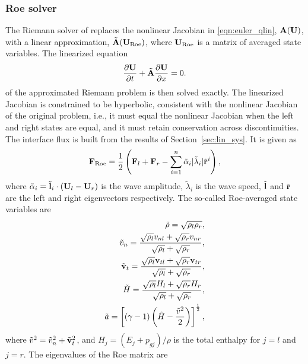 \subsubsection[Roe solver]{Roe solver}
\label{sec:roe_solver}

The Riemann solver of \citet{Roe:1981} replaces the nonlinear Jacobian in \eqref{eqn:euler_qlin}, $\mathbf{A} (\mathbf{U})$, with a linear approximation, $\tilde{\mathbf{A}} (\mathbf{U}_{\text{Roe}})$, where $\mathbf{U}_{\text{Roe}}$ is a matrix of averaged state variables.  The linearized equation
\begin{gather}
\label{eqn:euler_linear}
\frac{\partial \mathbf{U}}{\partial t} + \tilde{\mathbf{A}} \frac{\partial \mathbf{U}}{\partial x} = 0.
\end{gather}
of the approximated Riemann problem is then solved exactly.  The linearized Jacobian is constrained to be hyperbolic, consistent with the nonlinear Jacobian of the original problem, i.e., it must equal the nonlinear Jacobian when the left and right states are equal, and it must retain conservation across discontinuities.  The interface flux is built from the results of Section~\ref{sec:lin_sys}.  It is given as
\begin{gather}
\label{eqn:roe_flux} 
\mathbf{F}_{\text{Roe}} = \frac{1}{2}\left( \mathbf{F}_l + \mathbf{F}_r - \sum_{i=1}^n \tilde{\alpha}_i | \tilde{\lambda}_i | \tilde{\mathbf{r}}^i \right),
\end{gather}
where $\tilde{\alpha}_i = \tilde{\mathbf{l}}_i \cdot (\mathbf{U}_l - \mathbf{U}_r)$ is the wave amplitude, $\tilde{\lambda}_i$ is the wave speed, $\tilde{\mathbf{l}}$ and $\tilde{\mathbf{r}}$ are the left and right eigenvectors respectively.  The so-called Roe-averaged state variables are
\begin{gather}
\begin{split}
\tilde{\rho} = \sqrt{\rho_l \rho_r}, \\
\tilde{v}_n  = \frac{\sqrt{\rho_l} v_{nl} + \sqrt{\rho_r} v_{nr}}{\sqrt{\rho_l} + \sqrt{\rho_r}}, \\
\tilde{\mathbf{v}}_{t}  = \frac{\sqrt{\rho_l} \mathbf{v}_{t l} + \sqrt{\rho_r} \mathbf{v}_{t r}}{\sqrt{\rho_l} + \sqrt{\rho_r}}, \\
\tilde{H}  = \frac{\sqrt{\rho_l} H_l + \sqrt{\rho_r} H_r}{\sqrt{\rho_l} + \sqrt{\rho_r}}, \\
\tilde{a} = \left[ (\gamma- 1) \left( \tilde{H} - \frac{\tilde{v}^2}{2}  \right)\right]^{\frac{1}{2}}, 
\end{split}
\end{gather}
where $\tilde{v}^2 = \tilde{v}_n^2 + \tilde{\mathbf{v}}_{t}^2$, and $H_j = (E_j + p_{gj})/\rho$ is the total enthalpy for $j=l$ and $j=r$.  The eigenvalues of the Roe matrix are
